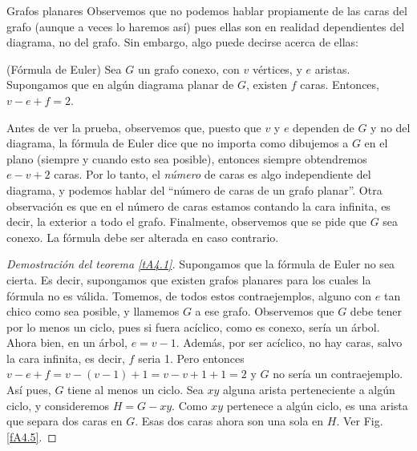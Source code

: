\begin{section}{Grafos planares}
Observemos que no podemos hablar propiamente de las caras del grafo (aunque a veces lo haremos así) pues ellas son en realidad dependientes del diagrama, no del grafo. Sin embargo, algo puede decirse acerca de ellas:

\begin{teorema}\label{tA4.1} (Fórmula de Euler) Sea $G$ un grafo conexo, con $v$ vértices, y $e$ aristas. Supongamos que en algún diagrama planar de $G$, existen $f$ caras. Entonces, $v-e+f=2$.
\end{teorema}

Antes de ver la prueba, observemos que, puesto que $v$ y $e$ dependen de $G$ y no del diagrama, la fórmula de Euler dice que no importa como dibujemos a $G$ en el plano (siempre y cuando esto sea posible), entonces siempre obtendremos $e-v+2$ caras. Por lo tanto, el \textit{número} de caras es algo independiente del
diagrama, y podemos hablar del ``número de caras de un grafo planar''. Otra observación es que en el número de caras estamos contando la cara infinita, es decir, la exterior a todo el grafo. Finalmente, observemos que se pide que $G$ sea conexo. La fórmula debe ser alterada en caso contrario.

\begin{proof}[Demostración del teorema \ref{tA4.1}] Supongamos que la fórmula de Euler no sea cierta. Es decir, supongamos que existen grafos planares para los cuales la fórmula no es válida. Tomemos, de todos estos contraejemplos, alguno con $e$ tan chico como sea posible, y llamemos $G$ a ese grafo. Observemos que $G$ debe tener por lo menos un ciclo, pues si fuera acíclico, como es conexo, sería un árbol. Ahora bien, en un árbol, $e=v-1$. Además, por ser acíclico, no hay caras, salvo la cara infinita, es decir, $f$ seria 1. Pero entonces $v-e+f=v-(v-1)+1=v-v+1+1=2$ y $G$ no sería un contraejemplo. Así pues, $G$ tiene al menos un ciclo. Sea $xy$ alguna arista perteneciente a algún ciclo, y consideremos $H=G-xy$. Como $xy$ pertenece a algún ciclo, es una arista que separa dos caras en $G$. Esas dos caras ahora son una sola en $H$. 
Ver Fig. \ref{fA4.5}.


\end{proof}
\end{section}
